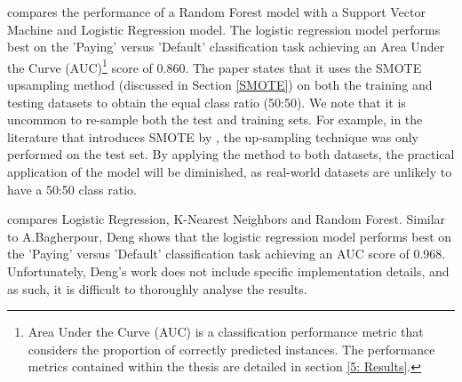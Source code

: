             \cite{similar_paper_bagherpour} compares the performance of a Random Forest model with a Support Vector Machine and Logistic Regression model. The logistic regression model performs best on the 'Paying' versus 'Default' classification task achieving an Area Under the Curve (AUC)\footnote{Area Under the Curve (AUC) is a classification performance metric that considers the proportion of correctly predicted instances. The performance metrics contained within the thesis are detailed in section \ref{5: Results}.} score of 0.860. The paper states that it uses the SMOTE upsampling method (discussed in Section \ref{SMOTE}) on both the training and testing datasets to obtain the equal class ratio (50:50). We note that it is uncommon to re-sample both the test and training sets. For example, in the literature that introduces SMOTE by \cite{SMOTE}, the up-sampling technique was only performed on the test set. By applying the method to both datasets, the practical application of the model will be diminished, as real-world datasets are unlikely to have a 50:50 class ratio.  
            
            \cite{similar_paper_deng} compares Logistic Regression, K-Nearest Neighbors and Random Forest. Similar to A.Bagherpour, Deng shows that the logistic regression model performs best on the 'Paying' versus 'Default' classification task achieving an AUC score of 0.968. Unfortunately, Deng's work does not include specific implementation details, and as such, it is difficult to thoroughly analyse the results. 
        
            

    
